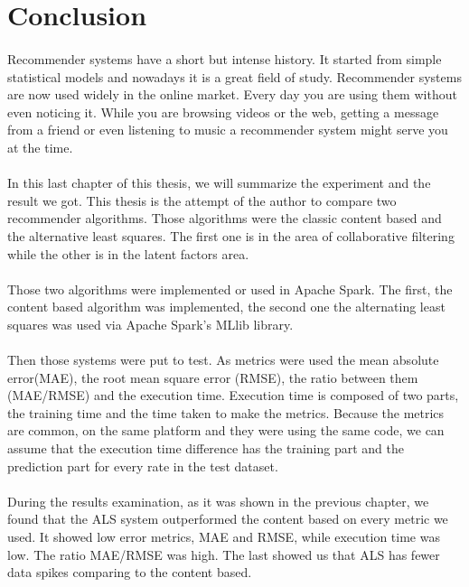 \section{Conclusion}
\paragraph{}Recommender systems have a short but intense history. It started from simple statistical models and nowadays it is a great field of study. Recommender systems are now used widely in the online market. Every day you are using them without even noticing it. While you are browsing videos or the web, getting a message from a friend or even listening to music a recommender system might serve you at the time.

\paragraph{} In this last chapter of this thesis, we will summarize the experiment and the result we got. This thesis is the attempt of the author to compare two recommender algorithms. Those algorithms were the classic content based and the alternative least squares. The first one is in the area of collaborative filtering while the other is in the latent factors area.

\paragraph{} Those two algorithms were implemented or used in Apache Spark. The first, the content based algorithm was implemented, the second one the alternating least squares was used via Apache Spark's MLlib library.

\paragraph{} Then those systems were put to test. As metrics were used the mean absolute error(MAE), the root mean square error (RMSE), the ratio between them (MAE/RMSE) and the execution time. Execution time is composed of two parts, the training time and the time taken to make the metrics. Because the metrics are common, on the same platform and they were using the same code, we can assume that the execution time difference has the training part and the prediction part for every rate in the test dataset.

\paragraph{} During the results examination, as it was shown in the previous chapter, we found that the ALS system outperformed the content based on every metric we used. It showed low error metrics, MAE and RMSE, while execution time was low. The ratio MAE/RMSE was high. The last showed us that ALS has fewer data spikes comparing to the content based.


